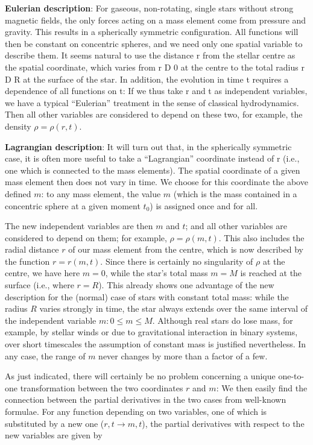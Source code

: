 \documentclass[a4paper,10pt]{article}
\begin{document}
{\noindent}\textbf{Eulerian description}: For gaseous, non-rotating, single stars without strong magnetic fields, the only forces acting on a mass element come from pressure and gravity. This results in a spherically symmetric configuration. All functions will then be constant on concentric spheres, and we need only one spatial variable to describe them. It seems natural to use the distance r from the stellar centre as the spatial coordinate, which varies from r D 0 at the centre to the total radius r D R at the surface of the star. In addition, the evolution in time t requires a dependence of all functions on t: If we thus take r and t as independent variables, we have a typical ``Eulerian'' treatment in the sense of classical hydrodynamics. Then all other variables are considered to depend on these two, for example, the density $\rho=\rho(r,t)$.

{\noindent}\textbf{Lagrangian description}: It will turn out that, in the spherically symmetric case, it is often more useful to take a ``Lagrangian'' coordinate instead of r (i.e., one which is connected to the mass elements). The spatial coordinate of a given mass element then does not vary in time. We choose for this coordinate the above defined $m$: to any mass element, the value $m$ (which is the mass contained in a concentric sphere at a given moment $t_0$) is assigned once and for all.

{\noindent}The new independent variables are then $m$ and $t$; and all other variables are considered to depend on them; for example, $\rho=\rho(m,t)$. This also includes the radial distance $r$ of our mass element from the centre, which is now described by the function $r=r(m,t)$. Since there is certainly no singularity of $\rho$ at the centre, we have here $m=0$, while the star's total mass $m=M$ is reached at the surface (i.e., where $r=R$). This already shows one advantage of the new description for the (normal) case of stars with constant total mass: while the radius $R$ varies strongly in time, the star always extends over the same interval of the independent variable $m:0\leq m \leq M$. Although real stars do lose mass, for example, by stellar winds or due to gravitational interaction in binary systems, over short timescales the assumption of constant mass is justified nevertheless. In any case, the range of $m$ never changes by more than a factor of a few.

{\noindent}As just indicated, there will certainly be no problem concerning a unique one-to-one transformation between the two coordinates $r$ and $m$: We then easily find the connection between the partial derivatives in the two cases from well-known formulae. For any function depending on two variables, one of which is substituted by a new one ($r,t\rightarrow m,t$), the partial derivatives with respect to the new variables are given by
\end{document}
